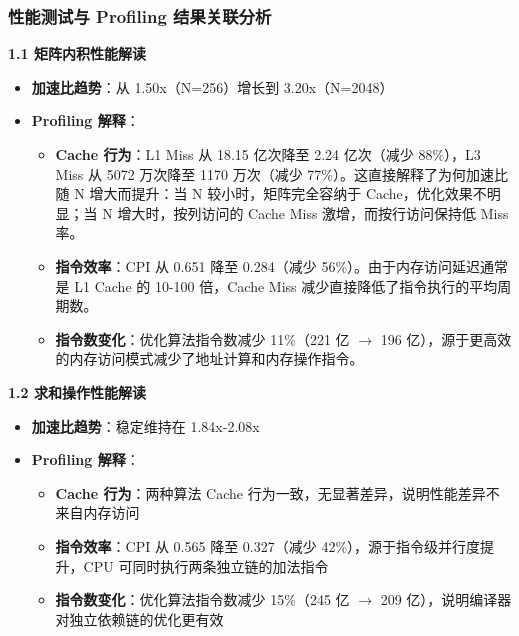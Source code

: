 ﻿\documentclass[9pt,a4paper]{article}
\begin{document}
\subsubsection{性能测试与 Profiling 结果关联分析}
\textbf{1.1 矩阵内积性能解读}
\begin{itemize}
    \item \textbf{加速比趋势}：从 1.50x（N=256）增长到 3.20x（N=2048）
    \item \textbf{Profiling 解释}：
    \begin{itemize}
        \item \textbf{Cache 行为}：L1 Miss 从 18.15 亿次降至 2.24 亿次（减少 88\%），L3 Miss 从 5072 万次降至 1170 万次（减少 77\%）。这直接解释了为何加速比随 N 增大而提升：当 N 较小时，矩阵完全容纳于 Cache，优化效果不明显；当 N 增大时，按列访问的 Cache Miss 激增，而按行访问保持低 Miss 率。
        \item \textbf{指令效率}：CPI 从 0.651 降至 0.284（减少 56\%）。由于内存访问延迟通常是 L1 Cache 的 10-100 倍，Cache Miss 减少直接降低了指令执行的平均周期数。
        \item \textbf{指令数变化}：优化算法指令数减少 11\%（221 亿 $\rightarrow$ 196 亿），源于更高效的内存访问模式减少了地址计算和内存操作指令。
    \end{itemize}
\end{itemize}

\textbf{1.2 求和操作性能解读}
\begin{itemize}
    \item \textbf{加速比趋势}：稳定维持在 1.84x-2.08x
    \item \textbf{Profiling 解释}：
    \begin{itemize}
        \item \textbf{Cache 行为}：两种算法 Cache 行为一致，无显著差异，说明性能差异不来自内存访问
        \item \textbf{指令效率}：CPI 从 0.565 降至 0.327（减少 42\%），源于指令级并行度提升，CPU 可同时执行两条独立链的加法指令
        \item \textbf{指令数变化}：优化算法指令数减少 15\%（245 亿 $\rightarrow$ 209 亿），说明编译器对独立依赖链的优化更有效
    \end{itemize}
\end{itemize}
\end{document}

